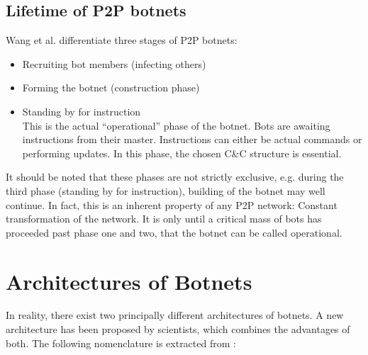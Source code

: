 \documentclass{llncs}
\begin{document}
\subsection{Lifetime of P2P botnets}
Wang et al.\cite{wang2009systematic} differentiate three stages of P2P botnets:
\begin{itemize}
\item Recruiting bot members (infecting others)
\item Forming the botnet (construction phase)
\item Standing by for instruction \\
This is the actual ``operational'' phase of the botnet. Bots are awaiting instructions from their master. Instructions can either be actual commands or performing updates. In this phase, the chosen C\&C structure is essential.
\end{itemize}
It should be noted that these phases are not strictly exclusive,
e.g. during the third phase (standing by for instruction), building of
the botnet may well continue. In fact, this is an inherent property of
any P2P network: Constant transformation of the network. It is only
until a critical mass of bots has proceeded past phase one and two,
that the botnet can be called operational.

\section{Architectures of Botnets}
In reality, there exist two principally different architectures of
botnets. A new architecture has been proposed by scientists, which
combines the advantages of both. The following nomenclature is
extracted from \cite{steggink2007detection}:
\end{document}
